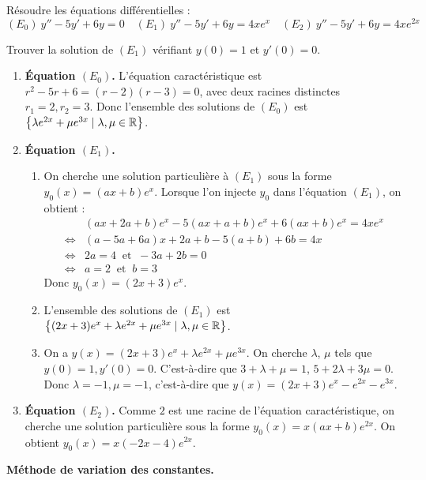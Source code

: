 \documentclass[class=report,crop=false]{standalone}
\begin{document}
\begin{exemple}
Résoudre les équations différentielles :
$$(E_0) \  y''-5y'+6y=0 \quad
(E_1) \  y''-5y'+6y=4xe^x \quad
(E_2) \  y''-5y'+6y=4xe^{2x}$$

Trouver la solution de $(E_1)$ vérifiant $y(0)=1$ et $y'(0)=0$.


\begin{enumerate}
  \item \textbf{Équation $(E_0)$.}
  L'équation caractéristique est $r^2-5r+6=(r-2)(r-3)=0$, avec deux
racines distinctes $r_1=2, r_2=3$.
Donc l'ensemble des solutions de $(E_0)$ est $\big\{\lambda e^{2x}+ \mu e^{3x} \mid
\lambda, \mu \in \mathbb{R}\big\}$.



  \item \textbf{Équation $(E_1)$.}
  \begin{enumerate}
    \item On cherche une solution particulière à $(E_1)$ sous la forme
$y_0(x)=(ax+b)e^x$. Lorsque l'on injecte $y_0$ dans l'équation $(E_1)$, on obtient :
$$\begin{array}{rl}
& (ax+2a+b)e^x-5(ax+a+b)e^x+6(ax+b)e^x=4xe^x \\
\iff & (a-5a+6a)x+2a+b-5(a+b)+6b=4x \\
\iff & 2a=4 \ \text{ et }\ -3a+2b=0 \\
\iff & a=2 \ \text{ et }\ b=3
\end{array}$$
 Donc $y_0(x)=(2x+3)e^x$.

    \item L'ensemble des solutions de $(E_1)$ est
$\big\{(2x+3)e^x+\lambda e^{2x} + \mu e^{3x} \mid \lambda,\mu\in \mathbb{R}\big\}$.

    \item On a $y(x)=(2x+3)e^x+ \lambda e^{2x} + \mu e^{3x}$. On cherche $\lambda$,
$\mu$ tels que $y(0)=1, y'(0)=0$. C'est-à-dire que
$3+\lambda+\mu=1$, $5+2\lambda+3\mu=0$. Donc $\lambda=-1, \mu=-1$, c'est-à-dire que
$y(x)=(2x+3)e^{x}-e^{2x}-e^{3x}$.
  \end{enumerate}
  \item \textbf{Équation $(E_2)$.}
  Comme $2$ est une racine de l'équation caractéristique, on
  cherche une solution particulière sous la forme $y_0(x)=x(ax+b)e^{2x}$.
  On obtient $y_0(x)=x(-2x-4)e^{2x}$.
\end{enumerate}
\end{exemple}

\bigskip


\textbf{Méthode de variation des constantes.}
\end{document}
